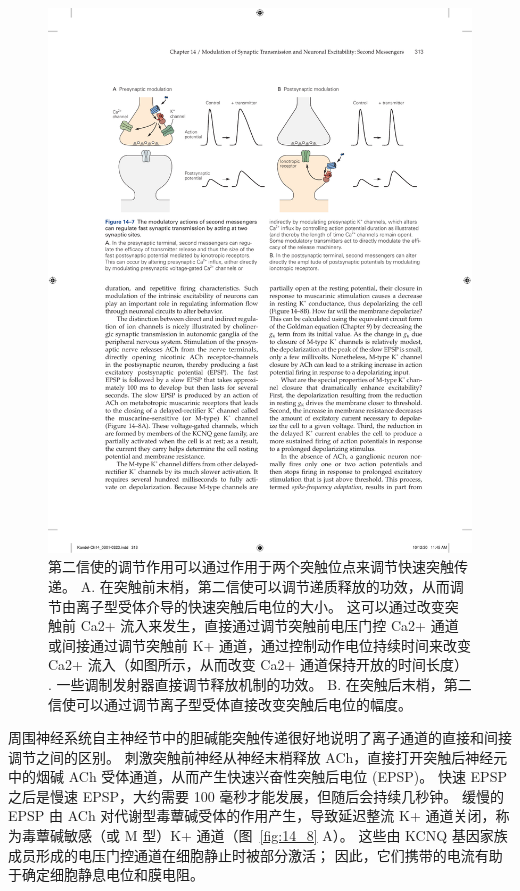 \begin{figure}[htbp]
	\centering
	\includegraphics[width=0.9\linewidth]{chap14/fig_14_7}
	\caption{第二信使的调节作用可以通过作用于两个突触位点来调节快速突触传递。 A. 在突触前末梢，第二信使可以调节递质释放的功效，从而调节由离子型受体介导的快速突触后电位的大小。 这可以通过改变突触前 Ca2+ 流入来发生，直接通过调节突触前电压门控 Ca2+ 通道或间接通过调节突触前 K+ 通道，通过控制动作电位持续时间来改变 Ca2+ 流入（如图所示，从而改变 Ca2+ 通道保持开放的时间长度） . 一些调制发射器直接调节释放机制的功效。 B. 在突触后末梢，第二信使可以通过调节离子型受体直接改变突触后电位的幅度。}
	\label{fig:14_7}
\end{figure}


周围神经系统自主神经节中的胆碱能突触传递很好地说明了离子通道的直接和间接调节之间的区别。
刺激突触前神经从神经末梢释放 ACh，直接打开突触后神经元中的烟碱 ACh 受体通道，从而产生快速兴奋性突触后电位 (EPSP)。
快速 EPSP 之后是慢速 EPSP，大约需要 100 毫秒才能发展，但随后会持续几秒钟。
缓慢的 EPSP 由 ACh 对代谢型毒蕈碱受体的作用产生，导致延迟整流 K+ 通道关闭，称为毒蕈碱敏感（或 M 型）K+ 通道（图~\ref{fig:14_8} A）。
这些由 KCNQ 基因家族成员形成的电压门控通道在细胞静止时被部分激活；
因此，它们携带的电流有助于确定细胞静息电位和膜电阻。


